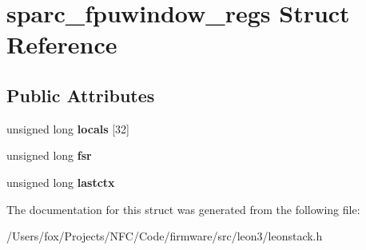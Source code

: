 \hypertarget{structsparc__fpuwindow__regs}{
\section{sparc\_\-fpuwindow\_\-regs Struct Reference}
\label{structsparc__fpuwindow__regs}
}
\subsection*{Public Attributes}
\begin{DoxyCompactItemize}
\item 
\hypertarget{structsparc__fpuwindow__regs_ac2d1a3d5fb56ad140678cbf84c68a4ca}{
unsigned long {\bfseries locals} \mbox{[}32\mbox{]}}
\label{structsparc__fpuwindow__regs_ac2d1a3d5fb56ad140678cbf84c68a4ca}

\item 
\hypertarget{structsparc__fpuwindow__regs_a1cbdcd88e9d833a0f488fe8e61359fc4}{
unsigned long {\bfseries fsr}}
\label{structsparc__fpuwindow__regs_a1cbdcd88e9d833a0f488fe8e61359fc4}

\item 
\hypertarget{structsparc__fpuwindow__regs_aa0de1b0a284b2664dc7364d3c2201d90}{
unsigned long {\bfseries lastctx}}
\label{structsparc__fpuwindow__regs_aa0de1b0a284b2664dc7364d3c2201d90}

\end{DoxyCompactItemize}


The documentation for this struct was generated from the following file:\begin{DoxyCompactItemize}
\item 
/Users/fox/Projects/NFC/Code/firmware/src/leon3/leonstack.h\end{DoxyCompactItemize}
